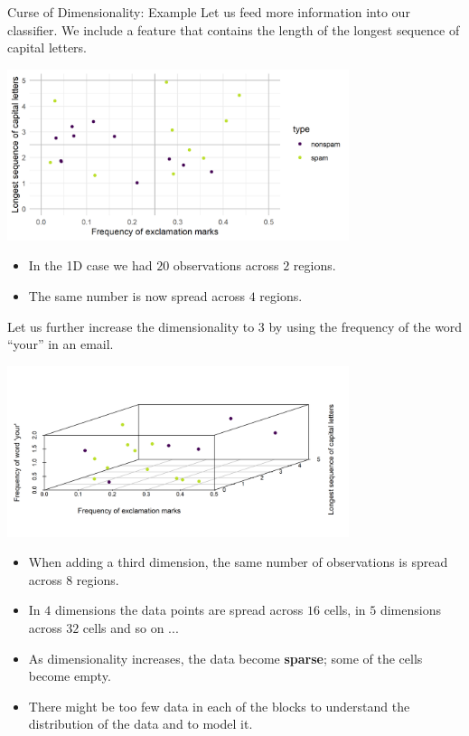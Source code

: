 \documentclass[11pt,compress,t,notes=noshow, xcolor=table]{beamer}
\begin{document}
\begin{vbframe}{Curse of Dimensionality: Example}
Let us feed more information into our classifier. We include a feature that contains the length of the longest sequence of capital letters.
\medskip

\vspace*{0.1cm}
\begin{center}
\includegraphics[width = 10cm ]{figure/capital_letters_plot.png}
\end{center}

\begin{itemize}
\item In the 1D case we had $20$ observations across $2$ regions.
\item The same number is now spread across $4$ regions.
\end{itemize}
\framebreak


Let us further increase the dimensionality to 3 by using the frequency of the word \enquote{your} in an email.

\vspace*{0.1cm}
\begin{center}
\includegraphics[width = 10cm]{figure/capital_letters_3d_plot.png}
\end{center}

\vspace*{-.3cm}

\framebreak

\begin{itemize}
\item When adding a third dimension, the same number of observations is spread across $8$ regions.
\item In $4$ dimensions the data points are spread across $16$ cells, in $5$ dimensions across $32$ cells and so on ...
\item As dimensionality increases, the data become \textbf{sparse}; some of the cells become empty.
\item There might be too few data in each of the blocks to understand the distribution of the data and to model it.
\end{itemize}



\end{vbframe}
\end{document}
